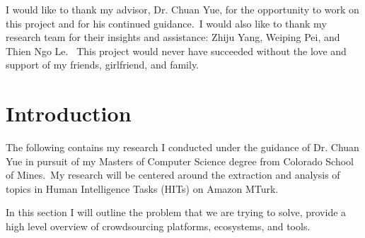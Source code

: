 \documentclass[letterpaper,12pt]{article}
\begin{document}

\begin{acknowledgments}
I would like to thank my advisor, Dr. Chuan Yue, for the opportunity to work on this project and for his continued guidance.\
I would also like to thank my research team for their insights and assistance: Zhiju Yang, Weiping Pei, and Thien Ngo Le. \
This project would never have succeeded without the love and support of my friends, girlfriend, and family.
\end{acknowledgments}
\newpage




\bodymatter



\chapter{Introduction}

The following contains my research I conducted under the guidance of Dr. Chuan Yue in pursuit of my Masters of Computer Science degree from Colorado School of Mines.\
My research will be centered around the extraction and analysis of topics in Human Intelligence Tasks (HITs) on Amazon MTurk. 

In this section I will outline the problem that we are trying to solve, provide a high level overview of crowdsourcing platforms, ecosystems, and tools.
\end{document}
